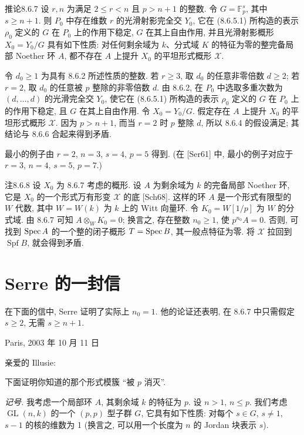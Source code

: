 \begin{origstatement}{推论}{8.6.7}\label{ch08:cor867}
设 $r,n$ 为满足 $2\leq r<n$ 且 $p>n+1$ 的整数. 令 $G=\mathbb F_p^s$, 其中 $s\geq n+1$. 则 $P_0$ 中存在维数 $r$ 的光滑射影完全交 $Y_0$, 它在 (8.6.5.1) 所构造的表示 $\rho_0$ 定义的 $G$ 在 $P_0$ 上的作用下稳定, $G$ 在其上自由作用, 并且光滑射影概形 $X_0=Y_0/G$ 具有如下性质: 对任何剩余域为 $k$、分式域 $K$ 的特征为零的整完备局部 Noether 环 $A$, 都不存在 $A$ 上提升 $X_0$ 的平坦形式概形 $\mathcal X$.
\end{origstatement}
令 $d_0\geq1$ 为具有 8.6.2 所述性质的整数. 若 $r\geq3$, 取 $d_0$ 的任意非零倍数 $d\geq2$; 若 $r=2$, 取 $d_0$ 的任意被 $p$ 整除的非零倍数 $d$. 由 8.6.2, 在 $P_0$ 中选取多重次数为 $(d,\ldots,d)$ 的光滑完全交 $Y_0$, 使它在 (8.6.5.1) 所构造的表示 $\rho_0$ 定义的 $G$ 在 $P_0$ 上的作用下稳定, 且 $G$ 在其上自由作用. 令 $X_0=Y_0/G$. 假定存在 $A$ 上提升 $X_0$ 的平坦形式概形 $\mathcal X$. 因为 $p>n+1$, 而当 $r=2$ 时 $p$ 整除 $d$, 所以 8.6.4 的假设满足; 其结论与 8.6.6 合起来得到矛盾.

最小的例子由 $r=2$, $n=3$, $s=4$, $p=5$ 得到. (在 [Ser61] 中, 最小的例子对应于 $r=3$, $n=4$, $s=5$, $p=7$.)

\begin{origstatement}{注}{8.6.8}\label{ch08:rem868}
设 $X_0$ 为 8.6.7 考虑的概形. 设 $A$ 为剩余域为 $k$ 的完备局部 Noether 环, 它是 $X_0$ 的一个形式万有形变 $\mathcal X$ 的底 [Sch68]. 这样的环 $A$ 是一个形式有限型的 $W$ 代数, 其中 $W=W(k)$ 为 $k$ 上的 Witt 向量环. 令 $K_0=W[1/p]$ 为 $W$ 的分式域. 由 8.6.7 可知 $A\otimes_WK_0=0$; 换言之, 存在整数 $n_0\geq1$, 使 $p^{n_0}A=0$. 否则, 可找到 $\operatorname{Spec} A$ 的一个整的闭子概形 $T=\operatorname{Spec} B$, 其一般点特征为零. 将 $\mathcal X$ 拉回到 $\operatorname{Spf}B$, 就会得到矛盾.
\end{origstatement}

\section{Serre 的一封信}\label{ch08:sec87}
在下面的信中, Serre 证明了实际上 $n_0=1$. 他的论证还表明, 在 8.6.7 中只需假定 $s\geq2$, 无需 $s\geq n+1$.

\begin{flushright}Paris, 2003 年 10 月 11 日\end{flushright}
亲爱的 Illusie:

下面证明你知道的那个形式模簇 ``被 $p$ 消灭''.

\emph{记号.} 我考虑一个局部环 $A$, 其剩余域 $k$ 的特征为 $p$. 设 $n>1$, $n\leq p$. 我们考虑 $\operatorname{GL}(n,k)$ 的一个 $(p,p)$ 型子群 $G$, 它具有如下性质: 对每个 $s\in G$, $s\ne1$, $s-1$ 的核的维数为 1 (换言之, 可以用一个长度为 $n$ 的 Jordan 块表示 $s$).

